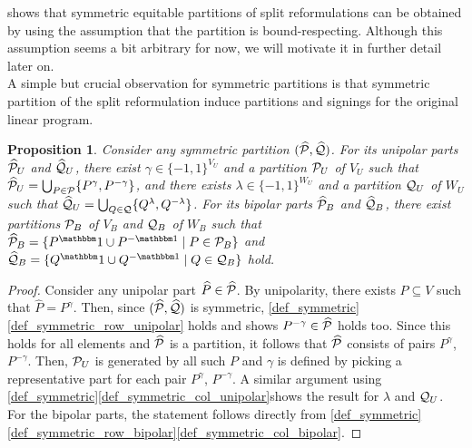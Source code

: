 \documentclass[pdflatex,sn-mathphys-num]{sn-jnl}%
\theoremstyle{thmstyleone}%
\newtheorem{proposition}[proposition]{Proposition}
\theoremstyle{thmstylethree}%
\theoremstyle{thmstyletwo}%
\begin{document}
 shows that symmetric equitable partitions of split reformulations can be obtained by using the assumption that the partition is bound-respecting.
Although this assumption seems a bit arbitrary for now, we will motivate it in further detail later on.\\

A simple but crucial observation for symmetric partitions is that symmetric partition of the split reformulation induce partitions and signings for the original linear program.
\begin{proposition}
\label{thm_unipolar_original_mapping}
    Consider any symmetric partition $(\widehat{\mathcal{P}},\widehat{\mathcal{Q}})$. For its unipolar parts $\widehat{\mathcal{P}}_U$ and $\widehat{\mathcal{Q}}_U$, there exist $\gamma\in \{-1,1\}^{V_U}$ and a partition $\mathcal{P}_U$ of $V_U$ such that $\widehat{\mathcal{P}}_U = \bigcup_{P\in \mathcal{P}}\{ P^\gamma, P^{-\gamma}\}$, and there exists $\lambda\in \{-1,1\}^{W_U}$ and a partition $\mathcal{Q}_U$ of $W_U$ such that $\widehat{\mathcal{Q}}_U = \bigcup_{Q\in \mathcal{Q}} \{ Q^\lambda, Q^{-\lambda}\}$. For its bipolar parts $\widehat{\mathcal{P}}_B$ and $\widehat{\mathcal{Q}}_B$, there exist partitions $\mathcal{P}_B$ of $V_B$ and $\mathcal{Q}_B$ of $W_B$ such that $\widehat{\MP}_B = \{P^\onevec \cup P^{-\onevec} \mid P \in \MP_B\}$ and $\widehat{\MQ}_B = \{Q^\onevec \cup Q^{-\onevec} \mid  Q \in \MQ_B\}$ hold. 
\end{proposition}
\begin{proof}
    Consider any unipolar part $\widehat{P}\in \widehat{\mathcal{P}}$. By unipolarity, there exists $P\subseteq V$ such that $\widehat{P} = P^\gamma$. Then, since $(\widehat{\mathcal{P}},\widehat{\mathcal{Q}})$ is symmetric,   \cref{def_symmetric}\ref{def_symmetric_row_unipolar} holds and shows $P^{-\gamma}\in \widehat{\mathcal{P}}$ holds too. Since this holds for all elements and $\widehat{\mathcal{P}}$ is a partition, it follows that $\widehat{\mathcal{P}}$ consists of pairs $P^\gamma$, $P^{-\gamma}$. Then, $\mathcal{P}_U$ is generated by all such $P$ and $\gamma$ is defined by picking a representative part for each pair $P^\gamma$, $P^{-\gamma}$. A similar argument using \cref{def_symmetric}\ref{def_symmetric_col_unipolar}shows the result for $\lambda$ and $\mathcal{Q}_U$.
    For the bipolar parts, the statement follows directly from \cref{def_symmetric}\ref{def_symmetric_row_bipolar}\ref{def_symmetric_col_bipolar}.
\end{proof}
\end{document}
